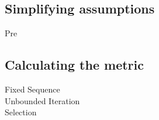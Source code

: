 \subsection{Simplifying assumptions}

\begin{description}

\item [Pre]

\end{description}

\subsection{Calculating the metric}

\begin{description}

\item [Fixed Sequence]

\item [Unbounded Iteration]

\item [Selection]

\end{description}
